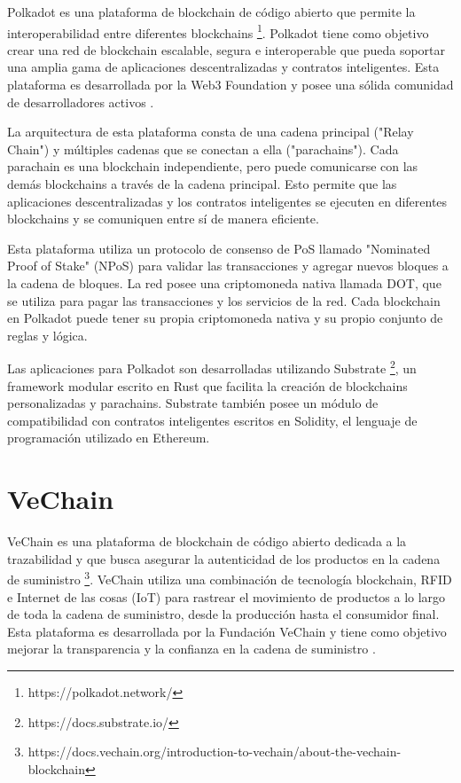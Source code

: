 \documentclass[main.tex]{subfiles}
\begin{document}
Polkadot es una plataforma de blockchain de código abierto que permite la interoperabilidad entre diferentes blockchains \footnote{https://polkadot.network/}. Polkadot tiene como objetivo crear una red de blockchain escalable, segura e interoperable que pueda soportar una amplia gama de aplicaciones descentralizadas y contratos inteligentes. Esta plataforma es desarrollada por la Web3 Foundation y posee una sólida comunidad de desarrolladores activos \cite{wood2016polkadot}.

La arquitectura de esta plataforma consta de una cadena principal ("Relay Chain") y múltiples cadenas que se conectan a ella ("parachains"). Cada parachain es una blockchain independiente, pero puede comunicarse con las demás blockchains a través de la cadena principal. Esto permite que las aplicaciones descentralizadas y los contratos inteligentes se ejecuten en diferentes blockchains y se comuniquen entre sí de manera eficiente. 

Esta plataforma utiliza un protocolo de consenso de PoS llamado "Nominated Proof of Stake" (NPoS) para validar las transacciones y agregar nuevos bloques a la cadena de bloques. La red posee una criptomoneda nativa llamada DOT, que se utiliza para pagar las transacciones y los servicios de la red. Cada blockchain en Polkadot puede tener su propia criptomoneda nativa y su propio conjunto de reglas y lógica.

Las aplicaciones para Polkadot son desarrolladas utilizando Substrate \footnote{https://docs.substrate.io/}, un framework modular escrito en Rust que facilita la creación de blockchains personalizadas y parachains. Substrate también posee un módulo de compatibilidad con contratos inteligentes escritos en Solidity, el lenguaje de programación utilizado en Ethereum.

\section{VeChain}

VeChain es una plataforma de blockchain de código abierto dedicada a la trazabilidad y que busca asegurar la autenticidad de los productos en la cadena de suministro \footnote{https://docs.vechain.org/introduction-to-vechain/about-the-vechain-blockchain}. VeChain utiliza una combinación de tecnología blockchain, RFID e Internet de las cosas (IoT) para rastrear el movimiento de productos a lo largo de toda la cadena de suministro, desde la producción hasta el consumidor final. Esta plataforma es desarrollada por la Fundación VeChain y tiene como objetivo mejorar la transparencia y la confianza en la cadena de suministro \cite{she2022vechain}.
\end{document}
